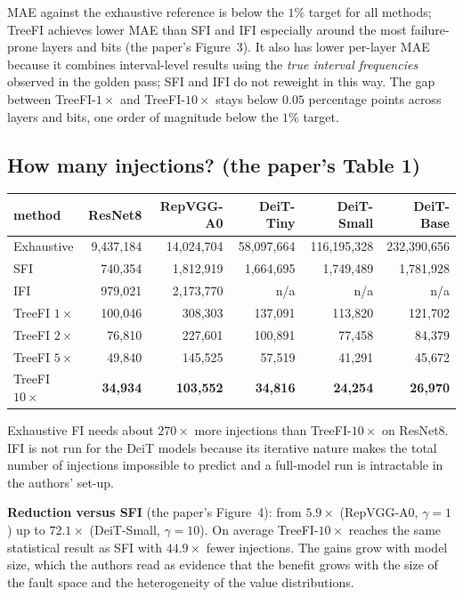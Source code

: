 MAE against the exhaustive reference is below the $1\%$ target for all methods; TreeFI achieves lower MAE than SFI and IFI especially around the most failure-prone layers and bits (the paper's Figure~3). It also has lower per-layer MAE because it combines interval-level results using the
\emph{true interval frequencies} observed in the golden pass; SFI and IFI do not reweight in this way. The gap between TreeFI-$1\times$ and TreeFI-$10\times$ stays below $0.05$ percentage points across layers and bits, one order of magnitude below the $1\%$ target.

\subsection{How many injections? (the paper's Table 1)}
\begin{center}
\small
\begin{tabular}{lrrrrr}
\toprule
method & ResNet8 & RepVGG-A0 & DeiT-Tiny & DeiT-Small & DeiT-Base \\
\midrule
Exhaustive & 9{,}437{,}184 & 14{,}024{,}704 & 58{,}097{,}664 & 116{,}195{,}328 & 232{,}390{,}656 \\
SFI & 740{,}354 & 1{,}812{,}919 & 1{,}664{,}695 & 1{,}749{,}489 & 1{,}781{,}928 \\
IFI & 979{,}021 & 2{,}173{,}770 & n/a & n/a & n/a \\
TreeFI $1\times$ & 100{,}046 & 308{,}303 & 137{,}091 & 113{,}820 & 121{,}702 \\
TreeFI $2\times$ & 76{,}810 & 227{,}601 & 100{,}891 & 77{,}458 & 84{,}379 \\
TreeFI $5\times$ & 49{,}840 & 145{,}525 & 57{,}519 & 41{,}291 & 45{,}672 \\
TreeFI $10\times$ & \textbf{34{,}934} & \textbf{103{,}552} & \textbf{34{,}816} & \textbf{24{,}254} & \textbf{26{,}970} \\
\bottomrule
\end{tabular}
\end{center}
Exhaustive FI needs about $270\times$ more injections than TreeFI-$10\times$ on ResNet8. IFI is not run for the DeiT models because its iterative nature makes the total number of injections impossible to predict and a full-model run is intractable in the authors' set-up.

\textbf{Reduction versus SFI} (the paper's Figure~4): from $5.9\times$ (RepVGG-A0, $\gamma=1$) up to $\mathbf{72.1\times}$ (DeiT-Small, $\gamma=10$). On average TreeFI-$10\times$ reaches the same statistical result as SFI with $44.9\times$ fewer injections.
The gains grow with model size, which the authors read as evidence that the benefit grows with the size of the fault space and the heterogeneity of the value distributions.

